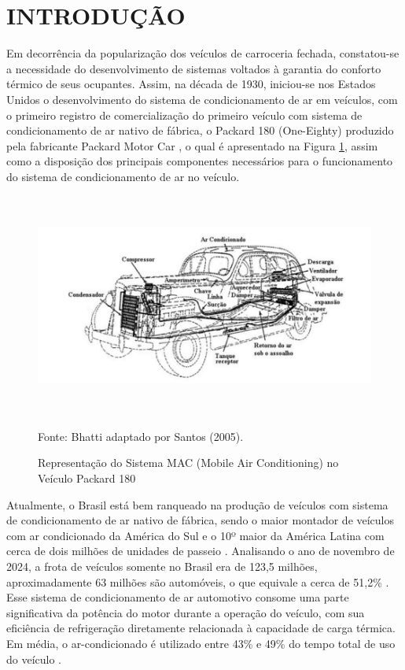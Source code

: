 \section{INTRODUÇÃO}

Em decorrência da popularização dos veículos de carroceria fechada, constatou-se a necessidade do desenvolvimento de sistemas voltados à garantia do conforto térmico de seus ocupantes. 
Assim, na década de 1930, iniciou-se nos Estados Unidos o desenvolvimento do sistema de condicionamento de ar em veículos, com o primeiro registro de comercialização do primeiro veículo com sistema de condicionamento de ar nativo de fábrica, o Packard 180 (One-Eighty) produzido pela fabricante Packard Motor Car \cite{bhatti1999}, o qual é apresentado na Figura \ref{fig:sistemaMAC}, assim como a disposição dos principais componentes necessários para o funcionamento do sistema de condicionamento de ar no veículo.
\\

\begin{figure}[h]
    \centering
    
    \caption{ Representação do Sistema MAC (Mobile Air Conditioning) no Veículo Packard 180}
    
    \includegraphics[width=15.65cm, height=7.35cm]{FigurasdoTexto/sistemaMAC.png}
    
     \vspace{5pt}  %
    {\footnotesize Fonte: Bhatti adaptado por Santos (2005).}  %
    \label{fig:sistemaMAC}
\end{figure}

Atualmente, o Brasil está bem ranqueado na produção de veículos com sistema de condicionamento de ar nativo de fábrica, sendo o maior montador de veículos com ar condicionado da América do Sul e o 10º maior da América Latina com cerca de dois milhões de unidades de passeio \cite{dasilva2024}. Analisando o ano de novembro de 2024, a frota de veículos somente no Brasil era de 123,5 milhões, aproximadamente 63 milhões são automóveis, o que equivale a cerca de 51,2\%  \cite{ministerio2024}.
\newpage
Esse sistema de condicionamento de ar automotivo consome uma parte significativa da potência do motor durante a operação do veículo, com sua eficiência de refrigeração diretamente relacionada à capacidade de carga térmica. Em média, o ar-condicionado é utilizado entre 43\% e 49\% do tempo total de uso do veículo \cite{farrington2000}.

